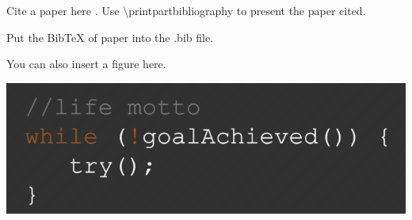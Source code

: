 \reviewer

\begin{generalcomment}
Cite a paper here \cite{jaffe2014underwater}.
Use \textbackslash printpartbibliography{} to present the paper cited.

Put the BibTeX of paper into the .bib file.
\end{generalcomment}
\begin{revmeta}[]
You can also insert a figure here.


\begin{minipage}{\textwidth}
\centering
\includegraphics[width=\textwidth]{Reviewers/fig.png}
\setcounter{figure}{11}
\label{feature}
\end{minipage}
\end{revmeta}